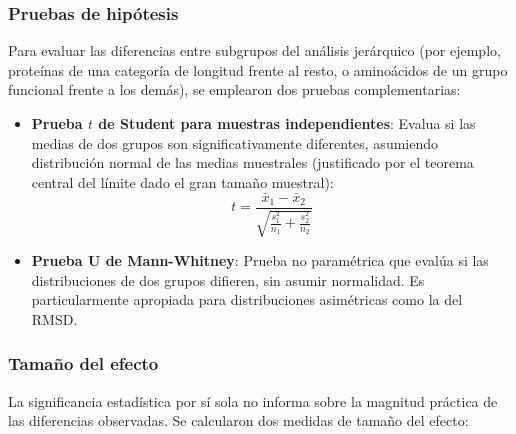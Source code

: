 \subsubsection{Pruebas de hip\'otesis}

Para evaluar las diferencias entre subgrupos del an\'alisis jer\'arquico (por ejemplo, prote\'inas de una categor\'ia de longitud frente al resto, o amino\'acidos de un grupo funcional frente a los dem\'as), se emplearon dos pruebas complementarias:

\begin{itemize}
    \item \textbf{Prueba $t$ de Student para muestras independientes}: Evalua si las medias de dos grupos son significativamente diferentes, asumiendo distribuci\'on normal de las medias muestrales (justificado por el teorema central del l\'imite dado el gran tama\~no muestral):
    \begin{equation}
        t = \frac{\bar{x}_1 - \bar{x}_2}{\sqrt{\frac{s_1^2}{n_1} + \frac{s_2^2}{n_2}}}
        \label{eq:t_test}
    \end{equation}

    \item \textbf{Prueba U de Mann-Whitney}: Prueba no param\'etrica que eval\'ua si las distribuciones de dos grupos difieren, sin asumir normalidad. Es particularmente apropiada para distribuciones asim\'etricas como la del RMSD.
\end{itemize}

\subsubsection{Tama\~no del efecto}

La significancia estad\'istica por s\'i sola no informa sobre la magnitud pr\'actica de las diferencias observadas. Se calcularon dos medidas de tama\~no del efecto:

